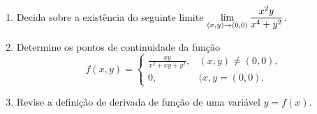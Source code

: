 \begin{frame}[label=limites]
	\begin{casa}
		\begin{enumerate}
			\item Decida sobre a existência do seguinte limite $\displaystyle\lim_{(x,y)\to(0,0)}\frac{x^2y}{x^4+y^2}$.
			
			\item Determine os pontos de continuidade da função
			\[f(x,y)=\begin{cases}
\frac{xy}{x^2+xy+y^2}, & (x,y)\neq (0,0),\\
0, & (x,y=(0,0).
			\end{cases}\]

\item Revise a definição de derivada de função de uma variável $y=f(x)$.
		\end{enumerate}
	\end{casa}
\end{frame}





